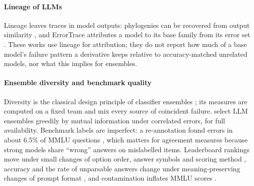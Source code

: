 \documentclass[preprint,12pt,authoryear]{elsarticle}
\begin{document}
\paragraph{Lineage of LLMs} Lineage leaves traces in model outputs: phylogenies can be recovered from output similarity \citep{yax2025phylolm}, and ErrorTrace attributes a model to its base family from its error set \citep{zang2025errortrace}. These works use lineage for attribution; they do not report how much of a base model's failure pattern a derivative keeps relative to accuracy-matched unrelated models, nor what this implies for ensembles.

\paragraph{Ensemble diversity and benchmark quality} Diversity is the classical design principle of classifier ensembles \citep{kuncheva2003,brown2005}; its measures are computed on a fixed team and mix every source of coincident failure. \citet{turkmen2026} select LLM ensembles greedily by mutual information under correlated errors, for full availability. Benchmark labels are imperfect: a re-annotation found errors in about 6.5\% of MMLU questions \citep{gema2025mmlu}, which matters for agreement measures because strong models share ``wrong'' answers on mislabelled items. Leaderboard rankings move under small changes of option order, answer symbols and scoring method \citep{alzahrani2024benchmarks}, accuracy and the rate of unparsable answers change under meaning-preserving changes of prompt format \citep{sclar2024format}, and contamination inflates MMLU scores \citep{zhao2025mmlucf}.
\end{document}

